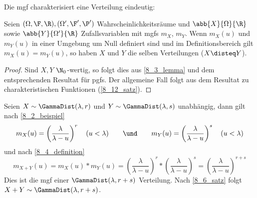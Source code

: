 Die mgf charakterisiert eine Verteilung eindeutig:
\begin{satz}
	\label{8_6_satz}
	Seien $(\Omega,\F,\R),(\Omega',\F',\P')$ Wahrscheinlichkeitsräume und $\abb{X}{\Omega}{\R}$ sowie $\abb{Y}{\Omega'}{\R}$ Zufallsvariablen mit mgfs $m_X$, $m_Y$. Wenn $m_X(u)$ und $m_Y(u)$ in einer Umgebung um Null definiert sind und im Definitionsbereich gilt $m_X(u) = m_Y(u)$, so haben $X$ und $Y$ die selben Verteilungen ($X \disteq Y$).
\end{satz}
\begin{proof}
	Sind $X,Y$ $\N_0$-wertig, so folgt dies aus \cref{8_3_lemma} und dem entsprechenden Resultat für pgfs. Der allgemeine Fall folgt aus dem Resultat zu charakteristischen Funktionen (\cref{8_12_satz}).
\end{proof}

\begin{beispiel}
	\label{8_7_beispiel}
	Seien $X \sim \GammaDist(\lambda,r)$ und $Y \sim \GammaDist(\lambda,s)$ unabhängig, dann gilt nach \cref{8_2_beispiel}
	\begin{equation*}
		m_X(u) = \left( \frac{\lambda}{\lambda-u} \right)^r \quad (u < \lambda) \qquad \und \qquad m_Y(u) = \left( \frac{\lambda}{\lambda-u} \right)^s \quad (u <\lambda)
	\end{equation*}
	und nach \cref{8_4_definition}
	\begin{equation*}
		m_{X+Y}(u) = m_X(u) * m_Y(u) =  \left( \frac{\lambda}{\lambda-u} \right)^r * \left( \frac{\lambda}{\lambda-u} \right)^s = \left( \frac{\lambda}{\lambda-u} \right)^{r+s}
	\end{equation*}
	Dies ist die mgf einer $\GammaDist(\lambda,r+s)$ Verteilung. Nach \cref{8_6_satz} folgt $X+Y \sim \GammaDist(\lambda, r+s)$.
\end{beispiel}


